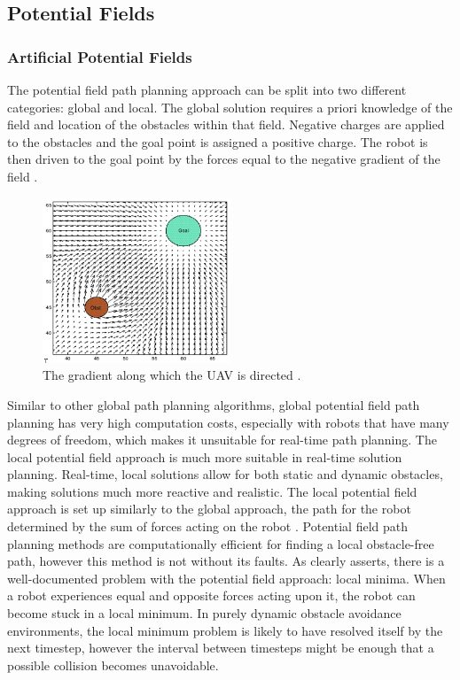 \documentclass[10pt, conference, compsocconf]{IEEEtran}
\begin{document}
\subsection{Potential Fields}
\subsubsection{Artificial Potential Fields}
The potential field path planning approach can be split into two different categories: global and local.  The global solution requires a priori knowledge of the field and location of the obstacles within that field. Negative charges are applied to the obstacles and the goal point is assigned a positive charge. The robot is then driven to the goal point by the forces equal to the negative gradient of the field \cite{park2001obstacle}. 

\begin{figure}[position here]
  \centering
   \includegraphics[width=0.5\textwidth]{EPS/potentialFieldPathPlanning}
  \caption{The gradient along which the UAV is directed \cite{potFieldPic}.}
\end{figure}

Similar to other global path planning algorithms, global potential field path planning has very high computation costs, especially with robots that have many degrees of freedom, which makes it unsuitable for real-time path planning.  The local potential field approach is much more suitable in real-time solution planning.  Real-time, local solutions allow for both static and dynamic obstacles, making solutions much more reactive and realistic. The local potential field approach is set up similarly to the global approach, the path for the robot determined by the sum of forces acting on the robot \cite{hwang1992potential}. Potential field path planning methods are computationally efficient for finding a local obstacle-free path, however this method is not without its faults. As \cite{park2001obstacle} clearly asserts, there is a well-documented problem with the potential field approach: local minima.  When a robot experiences equal and opposite forces acting upon it, the robot can become stuck in a local minimum.  In purely dynamic obstacle avoidance environments, the local minimum problem is likely to have resolved itself by the next timestep, however the interval between timesteps might be enough that a possible collision becomes unavoidable. 
\end{document}
